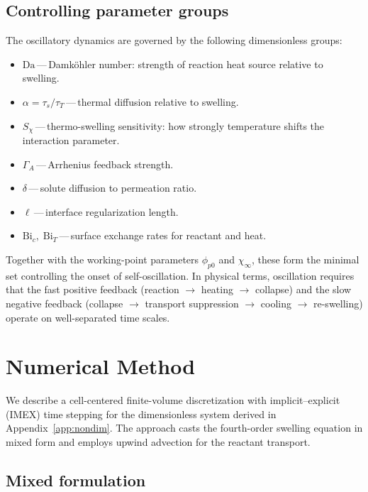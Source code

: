 \documentclass[aps,pre,reprint,superscriptaddress,longbibliography,floatfix]{revtex4-2}
\newcommand{\Da}{\mathrm{Da}}
\newcommand{\Bi}{\mathrm{Bi}}
\newcommand{\pp}{\phi_{p0}}
\begin{document}
\subsection{Controlling parameter groups}

The oscillatory dynamics are governed by the following dimensionless groups:
\begin{itemize}
  \item $\Da$\,---\,Damk\"ohler number: strength of reaction heat source relative to swelling.
  \item $\alpha = \tau_s/\tau_T$\,---\,thermal diffusion relative to swelling.
  \item $S_\chi$\,---\,thermo-swelling sensitivity: how strongly temperature shifts the interaction parameter.
  \item $\Gamma_A$\,---\,Arrhenius feedback strength.
  \item $\delta$\,---\,solute diffusion to permeation ratio.
  \item $\ell$\,---\,interface regularization length.
  \item $\Bi_c,\;\Bi_T$\,---\,surface exchange rates for reactant and heat.
\end{itemize}
Together with the working-point parameters $\pp$ and $\chi_\infty$, these form the minimal set controlling the onset of self-oscillation. In physical terms, oscillation requires that the fast positive feedback (reaction $\to$ heating $\to$ collapse) and the slow negative feedback (collapse $\to$ transport suppression $\to$ cooling $\to$ re-swelling) operate on well-separated time scales.

\section{Numerical Method}
\label{app:numerics}

We describe a cell-centered finite-volume discretization with implicit--explicit (IMEX) time stepping for the dimensionless system derived in Appendix~\ref{app:nondim}. The approach casts the fourth-order swelling equation in mixed form and employs upwind advection for the reactant transport.

\subsection{Mixed formulation}
\end{document}
